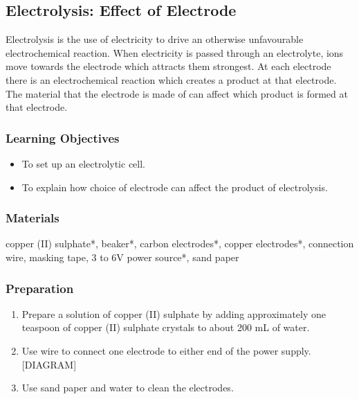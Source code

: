 \subsection{Electrolysis: Effect of Electrode}

Electrolysis is the use of electricity to drive an otherwise unfavourable electrochemical reaction. When electricity is passed through an electrolyte, ions move towards the electrode which attracts them strongest. At each electrode there is an electrochemical reaction which creates a product at that electrode. The material that the electrode is made of can affect which product is formed at that electrode.

\subsubsection*{Learning Objectives}
\begin{itemize}
\item{To set up an electrolytic cell.}
\item{To explain how choice of electrode can affect the product of electrolysis.}
\end{itemize}

\subsubsection*{Materials}
copper (II) sulphate*, beaker*, carbon electrodes*, copper electrodes*, connection wire, masking tape, 3 to 6V power source*, sand paper

\subsubsection*{Preparation}
\begin{enumerate}
\item{Prepare a solution of copper (II) sulphate by adding approximately one teaspoon of copper (II) sulphate crystals to about 200 mL of water.}
\item{Use wire to connect one electrode to either end of the power supply. [DIAGRAM]}
\item{Use sand paper and water to clean the electrodes.}
\end{enumerate}

